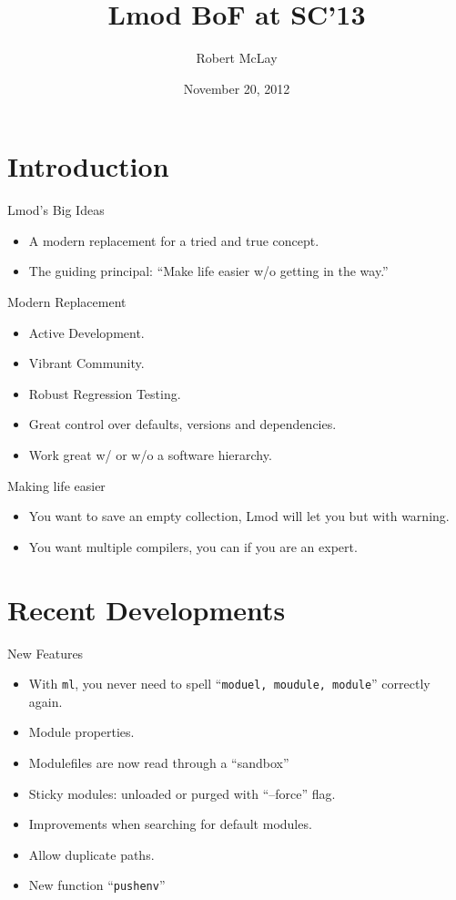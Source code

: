 \documentclass{beamer}
\title{Lmod BoF at SC'13}
\author{Robert McLay}
\institute{The Texas Advanced Computing Center}
\date{November 20, 2012}  %
\begin{document}
\begin{frame}
  \titlepage
\end{frame}

\section{Introduction}

\begin{frame}{Lmod's Big Ideas}
  \begin{itemize}
    \item A modern replacement for a tried and true concept.
    \item The guiding principal: ``Make life easier w/o getting in
      the way.''
  \end{itemize}
\end{frame}


\begin{frame}{Modern Replacement}
  \begin{itemize}
    \item Active Development.
    \item Vibrant Community.
    \item Robust Regression Testing.
    \item Great control over defaults, versions and dependencies.
    \item Work great w/ or w/o a software hierarchy.
  \end{itemize}
\end{frame}

\begin{frame}{Making life easier}
  \begin{itemize}
    \item You want to save an empty collection, Lmod will let you but
      with warning.
    \item You want multiple compilers, you can if you are an expert.
  \end{itemize}
\end{frame}

\section{Recent Developments}

\begin{frame}{New Features}
  \begin{itemize}
    \item With \texttt{ml}, you never need to spell ``\texttt{moduel, moudule, module}''
      correctly again.
    \item Module properties.
    \item Modulefiles are now read through a ``sandbox''
    \item Sticky modules: unloaded or purged with ``--force'' flag.
    \item Improvements when searching for default modules.
    \item Allow duplicate paths.
    \item New function ``\texttt{pushenv}'' 
  \end{itemize}
\end{frame}
\end{document}
